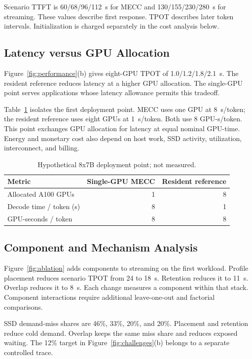 \documentclass[conference,9pt,letterpaper]{IEEEtran}
\newcommand{\mecc}{\textsc{MECC}}
\begin{document}
Scenario TTFT is 60/68/96/112~s for \mecc{} and 130/155/230/280~s for streaming. These values describe first response. TPOT describes later token intervals. Initialization is charged separately in the cost analysis below.

\subsection{Latency versus GPU Allocation}
Figure~\ref{fig:performance}(b) gives eight-GPU TPOT of 1.0/1.2/1.8/2.1~s. The resident reference reduces latency at a higher GPU allocation. The single-GPU point serves applications whose latency allowance permits this tradeoff.

Table~\ref{tab:gpu} isolates the first deployment point. \mecc{} uses one GPU at 8~s/token; the resident reference uses eight GPUs at 1~s/token. Both use 8 GPU-s/token. This point exchanges GPU allocation for latency at equal nominal GPU-time. Energy and monetary cost also depend on host work, SSD activity, utilization, interconnect, and billing.

\begin{table}[t]
\caption{Hypothetical 8x7B deployment point; not measured.}
\label{tab:gpu}\centering
\begin{tabular}{lrr}\toprule
Metric & Single-GPU \mecc{} & Resident reference\\\midrule
Allocated A100 GPUs & 1 & 8\\
Decode time / token (s) & 8 & 1\\
GPU-seconds / token & 8 & 8\\\bottomrule
\end{tabular}
\end{table}

\subsection{Component and Mechanism Analysis}
Figure~\ref{fig:ablation} adds components to streaming on the first workload. Profile placement reduces scenario TPOT from 24 to 18~s. Retention reduces it to 11~s. Overlap reduces it to 8~s. Each change measures a component within that stack. Component interactions require additional leave-one-out and factorial comparisons.

SSD demand-miss shares are 46\%, 33\%, 20\%, and 20\%. Placement and retention reduce cold demand. Overlap keeps the same miss share and reduces exposed waiting. The 12\% target in Figure~\ref{fig:challenges}(b) belongs to a separate controlled trace.
\end{document}

